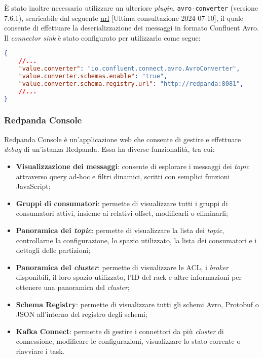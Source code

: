 È stato inoltre necessario utilizzare un ulteriore \textit{plugin}, \texttt{avro-converter} (versione 7.6.1), scaricabile dal seguente
\href{https://www.confluent.io/hub/confluentinc/kafka-connect-avro-converter}{\underline{url}} [Ultima consultazione 2024-07-10],
il quale consente di effettuare la deserializzazione dei messaggi in formato Confluent Avro.\\
Il \textit{connector sink} è stato configurato per utilizzarlo come segue:
\begin{lstlisting}[language=json]
{
    //...
    "value.converter": "io.confluent.connect.avro.AvroConverter",
    "value.converter.schemas.enable": "true",
    "value.converter.schema.registry.url": "http://redpanda:8081",
    //...
}
\end{lstlisting}

\subsubsection{Redpanda Console}
Redpanda Console è un'applicazione web che consente di gestire e effettuare \textit{debug} di un'istanza Redpanda. Essa ha diverse funzionalità, tra cui:
%
\begin{itemize}
	\item \textbf{Visualizzazione dei messaggi}: consente di esplorare i messaggi dei \textit{topic} attraverso query ad-hoc e filtri dinamici, scritti con semplici funzioni JavaScript;
	\item \textbf{Gruppi di consumatori}: permette di visualizzare tutti i gruppi di consumatori attivi, insieme ai relativi offset, modificarli o eliminarli;
	\item \textbf{Panoramica dei \textit{topic}}: permette di visualizzare la lista dei \textit{topic}, controllarne la configurazione, lo spazio utilizzato, la lista dei consumatori e i dettagli delle partizioni;
	\item \textbf{Panoramica del \textit{cluster}}: permette di visualizzare le ACL, i \textit{broker} disponibili, il loro spazio utilizzato, l'ID del rack e altre informazioni per ottenere una panoramica del \textit{cluster};
	\item \textbf{Schema Registry}: permette di visualizzare tutti gli schemi Avro, Protobuf o JSON all'interno del registro degli schemi;
	\item \textbf{Kafka Connect}: permette di gestire i connettori da più \textit{cluster} di connessione, modificare le configurazioni, visualizzare lo stato corrente o riavviare i task.
\end{itemize}

